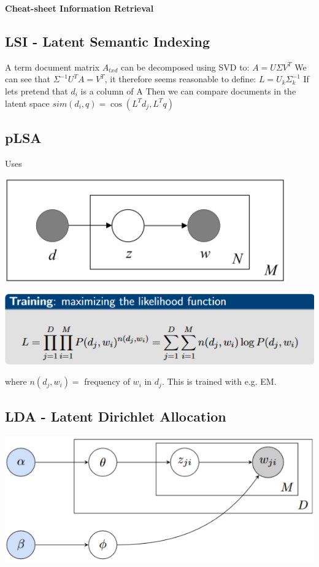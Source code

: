 \documentclass[a4paper,10pt,landscape]{article}
\newenvironment{Figure}
  {\par\medskip\noindent\minipage{\linewidth}}
  {\endminipage\par\medskip}
\newcommand{\topic}[1]{\begin{center}\section*{#1}\end{center}}
\begin{document}
\begin{center}
     \Large{\textbf{Cheat-sheet Information Retrieval}} \\
\end{center}
\begin{multicols}{3}
\topic{LSI - Latent Semantic Indexing}
A term document matrix $A_{txd}$ can be decomposed using SVD to:
$A = U\Sigma V^T$
We can see that $\Sigma^{-1}U^TA = V^T$, it therefore seems reasonable to define: $L = U_k\Sigma_k^{-1}$
If lets pretend that $d_i$ is a column of A
Then we can compare documents in the latent space
$sim(d_i,q) = \cos(L^Td_j,L^Tq)$
\topic{pLSA}
Uses 
\begin{Figure}
    \centering
    \includegraphics[width=\linewidth]{images/pLSA.png}
    \label{fig:my_label}
\end{Figure}
\begin{Figure}
    \centering
    \includegraphics[width=\linewidth]{images/pLSATrain.png}
    \label{fig:my_label}
\end{Figure}
where $n(d_j,w_i) =$ frequency of $w_i\text{ in } d_j$. This is trained with e.g. EM. 
\topic{LDA - Latent Dirichlet Allocation}
\begin{Figure}
    \centering
    \includegraphics[width=\linewidth]{images/LDA.png}
    \label{fig:my_label}
\end{Figure}


\end{multicols}
\end{document}
